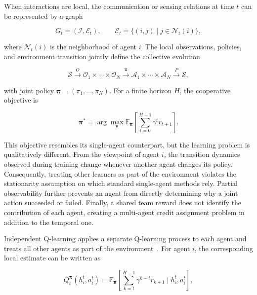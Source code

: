 When interactions are local, the communication or sensing relations at time $t$
can be represented by a graph

\begin{equation}
  G_t=(\mathcal{I},\mathcal{E}_t), \qquad
  \mathcal{E}_t=\{(i,j)\mid j\in\mathcal{N}_t(i)\},
  \label{eq:swarmdp-graph}
\end{equation}

where $\mathcal{N}_t(i)$ is the neighborhood of agent $i$.
%
The local observations, policies, and environment transition jointly define the
collective evolution

\begin{equation}
  \mathcal{S}
  \xrightarrow{O}
  \mathcal{O}_1\times\cdots\times\mathcal{O}_N
  \xrightarrow{\boldsymbol{\pi}}
  \mathcal{A}_1\times\cdots\times\mathcal{A}_N
  \xrightarrow{P}
  \mathcal{S},
  \label{eq:swarmdp-cycle}
\end{equation}

with joint policy $\boldsymbol{\pi}=(\pi_1,\ldots,\pi_N)$.
%
For a finite horizon $H$, the cooperative objective is

\begin{equation}
  \boldsymbol{\pi}^* =
  \arg\max_{\boldsymbol{\pi}}
  \mathbb{E}_{\boldsymbol{\pi}}
  \left[\sum_{t=0}^{H-1}\gamma^t r_{t+1}\right].
  \label{eq:swarmdp-objective}
\end{equation}

This objective resembles its single-agent counterpart, but the learning problem
is qualitatively different.
%
From the viewpoint of agent $i$, the transition dynamics observed during training
change whenever another agent changes its policy. Consequently, treating other
learners as part of the environment violates the stationarity assumption on which
standard single-agent methods rely.
%
Partial observability further prevents an agent from directly determining why a
joint action succeeded or failed.
%
Finally, a shared team reward does not identify the contribution of each agent,
creating a multi-agent credit assignment problem in addition to the temporal one.

Independent Q-learning applies a separate Q-learning process to each agent and
treats all other agents as part of the environment~\cite{tan1993multiagent}.
For agent $i$, the corresponding local estimate can be written as

\begin{equation}
  Q_i^{\boldsymbol{\pi}}(h_i^t,a_i^t) =
  \mathbb{E}_{\boldsymbol{\pi}}\!\left[
    \sum_{k=t}^{H-1}\gamma^{k-t}r_{k+1}
    \mid h_i^t,a_i^t
  \right],
  \label{eq:per-agent-q}
\end{equation}

